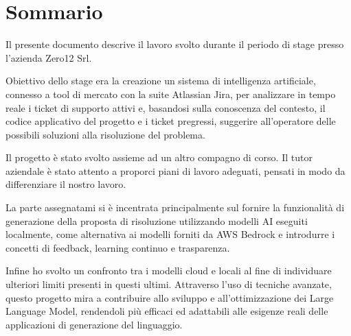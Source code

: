 \cleardoublepage
{}
{}
\begingroup
\let\clearpage\relax
\let\cleardoublepage\relax
\chapter*{Sommario}

Il presente documento descrive il lavoro svolto durante il periodo di stage presso l'azienda Zero12 Srl.

Obiettivo dello stage era la creazione un sistema di intelligenza artificiale, connesso a tool di mercato con la suite Atlassian Jira, per analizzare in tempo reale i ticket di supporto attivi e, basandosi sulla conoscenza del contesto, il codice applicativo del progetto e i ticket pregressi, suggerire all’operatore delle possibili soluzioni alla risoluzione del problema.

Il progetto è stato svolto assieme ad un altro compagno di corso. Il tutor aziendale è stato attento a proporci piani di lavoro adeguati, pensati in modo da differenziare il nostro lavoro. 

La parte assegnatami si è incentrata principalmente sul fornire la funzionalità di generazione della proposta di risoluzione utilizzando modelli AI eseguiti localmente, come alternativa ai modelli forniti da AWS Bedrock e introdurre i concetti di feedback, learning continuo e trasparenza.

Infine ho svolto un confronto tra i modelli cloud e locali al fine di individuare ulteriori limiti presenti in questi ultimi. 
Attraverso l'uso di tecniche avanzate, questo progetto mira a contribuire allo 
sviluppo e all'ottimizzazione dei Large Language Model, rendendoli più 
efficaci ed adattabili alle esigenze reali delle applicazioni di generazione 
del linguaggio.

\endgroup
\vfill
